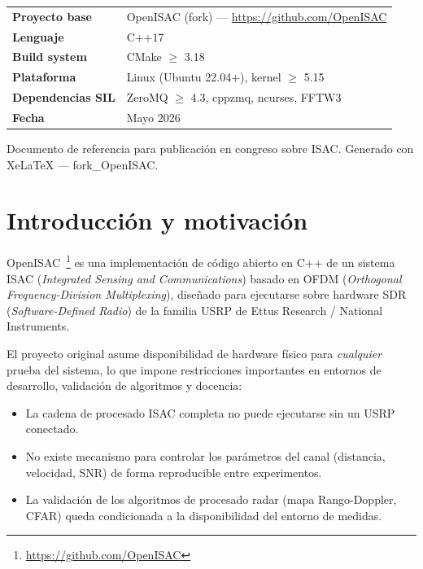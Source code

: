 \documentclass[11pt,a4paper]{article}
\begin{document}
\begin{titlepage}
\vspace{1.5cm}

\begin{tabular}{ll}
\toprule
\textbf{Proyecto base}     & OpenISAC (fork) — \url{https://github.com/OpenISAC} \\
\textbf{Lenguaje}          & C++17 \\
\textbf{Build system}      & CMake $\geq$ 3.18 \\
\textbf{Plataforma}        & Linux (Ubuntu 22.04+), kernel $\geq$ 5.15 \\
\textbf{Dependencias SIL}  & ZeroMQ $\geq$ 4.3, cppzmq, ncurses, FFTW3 \\
\textbf{Fecha}             & Mayo 2026 \\
\bottomrule
\end{tabular}

\vfill
{\small\color{codegray}
Documento de referencia para publicación en congreso sobre ISAC.
Generado con XeLaTeX — fork\_OpenISAC.
}
\end{titlepage}

\tableofcontents
\newpage

\section{Introducción y motivación}

OpenISAC~\footnote{\url{https://github.com/OpenISAC}} es una implementación de código abierto en C++ de un sistema
ISAC (\textit{Integrated Sensing and Communications}) basado en OFDM
(\textit{Orthogonal Frequency-Division Multiplexing}), diseñado para ejecutarse sobre
hardware SDR (\textit{Software-Defined Radio}) de la familia USRP de Ettus Research /
National Instruments.

El proyecto original asume disponibilidad de hardware físico para \emph{cualquier}
prueba del sistema, lo que impone restricciones importantes en entornos de desarrollo,
validación de algoritmos y docencia:
\begin{itemize}
  \item La cadena de procesado ISAC completa no puede ejecutarse sin un USRP conectado.
  \item No existe mecanismo para controlar los parámetros del canal (distancia, velocidad,
        SNR) de forma reproducible entre experimentos.
  \item La validación de los algoritmos de procesado radar (mapa Rango-Doppler, CFAR)
        queda condicionada a la disponibilidad del entorno de medidas.
\end{itemize}
\end{document}
